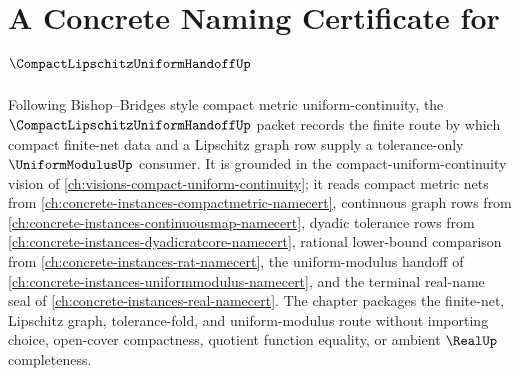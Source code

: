 \chapter{A Concrete Naming Certificate for $\CompactLipschitzUniformHandoffUp$}
\label{ch:concrete-instances-compact-lipschitz-uniform-handoff-namecert}

Following Bishop--Bridges style compact metric uniform-continuity, the $\CompactLipschitzUniformHandoffUp$ packet records the finite route by which compact finite-net data and a Lipschitz graph row supply a tolerance-only $\UniformModulusUp$ consumer. It is grounded in the compact-uniform-continuity vision of \autoref{ch:visions-compact-uniform-continuity}; it reads compact metric nets from \autoref{ch:concrete-instances-compactmetric-namecert}, continuous graph rows from \autoref{ch:concrete-instances-continuousmap-namecert}, dyadic tolerance rows from \autoref{ch:concrete-instances-dyadicratcore-namecert}, rational lower-bound comparison from \autoref{ch:concrete-instances-rat-namecert}, the uniform-modulus handoff of \autoref{ch:concrete-instances-uniformmodulus-namecert}, and the terminal real-name seal of \autoref{ch:concrete-instances-real-namecert}. The chapter packages the finite-net, Lipschitz graph, tolerance-fold, and uniform-modulus route without importing choice, open-cover compactness, quotient function equality, or ambient $\RealUp$ completeness.

